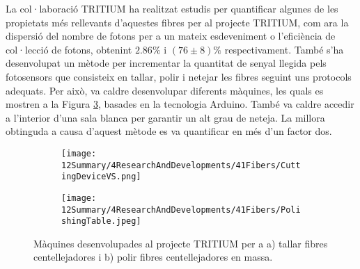 La col·laboració TRITIUM ha realitzat estudis per quantificar algunes de les propietats més rellevants d'aquestes fibres per al projecte TRITIUM, com ara la dispersió del nombre de fotons per a un mateix esdeveniment o l'eficiència de col·lecció de fotons, obtenint $2.86\%$ i $(76 \pm 8)\%$ respectivament. També s'ha desenvolupat un mètode per incrementar la quantitat de senyal llegida pels fotosensors que consisteix en tallar, polir i netejar les fibres seguint uns protocols adequats. Per això, va caldre desenvolupar diferents màquines, les quals es mostren a la Figura \ref{fig:MaquinesTRITIUM}, basades en la tecnologia Arduino. També va caldre accedir a l'interior d'una sala blanca per garantir un alt grau de neteja. La millora obtinguda a causa d'aquest mètode es va quantificar en més d'un factor dos. 

\begin{figure}
\centering
    \begin{subfigure}[b]{0.5\textwidth}
    \centering
    \texttt{[image: 12Summary/4ResearchAndDevelopments/41Fibers/CuttingDeviceVS.png]}  
    \caption{\label{subfig:MaquinaTallar}}
    \end{subfigure}
    \hfill
    \begin{subfigure}[b]{0.45\textwidth}
    \centering
    \texttt{[image: 12Summary/4ResearchAndDevelopments/41Fibers/PolishingTable.jpeg]}  
    \caption{\label{subfig:MaquinaPolir}}
    \end{subfigure}
 \caption{Màquines desenvolupades al projecte TRITIUM per a a) tallar fibres centellejadores i b) polir fibres centellejadores en massa. \label{fig:MaquinesTRITIUM}}
\end{figure}